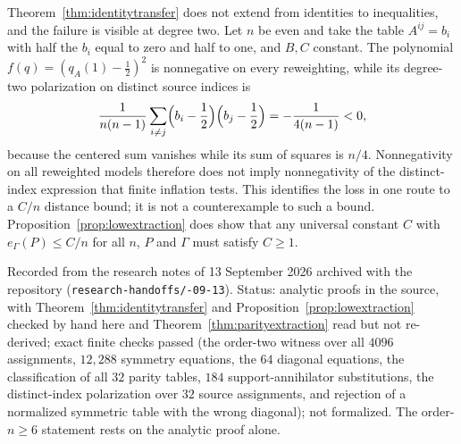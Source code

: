 Theorem~\ref{thm:identitytransfer} does not extend from identities to inequalities, and the failure is visible at degree two. Let $n$ be even and take the table $A^{ij}=b_i$ with half the $b_i$ equal to zero and half to one, and $B,C$ constant. The polynomial $f(q)=(q_A(1)-\tfrac12)^2$ is nonnegative on every reweighting, while its degree-two polarization on distinct source indices is
\[
\frac1{n(n-1)}\sum_{i\ne j}\Bigl(b_i-\frac12\Bigr)\Bigl(b_j-\frac12\Bigr)=-\frac1{4(n-1)}<0,
\]
because the centered sum vanishes while its sum of squares is $n/4$. Nonnegativity on all reweighted models therefore does not imply nonnegativity of the distinct-index expression that finite inflation tests. This identifies the loss in one route to a $C/n$ distance bound; it is not a counterexample to such a bound. Proposition~\ref{prop:lowextraction} does show that any universal constant $C$ with $e_\Gamma(P)\le C/n$ for all $n$, $P$ and $\Gamma$ must satisfy $C\ge1$.

Recorded from the research notes of 13 September 2026 archived with the repository (\texttt{research-\allowbreak handoffs/-09-13}). Status: analytic proofs in the source, with Theorem~\ref{thm:identitytransfer} and Proposition~\ref{prop:lowextraction} checked by hand here and Theorem~\ref{thm:parityextraction} read but not re-derived; exact finite checks passed (the order-two witness over all $4096$ assignments, $12{,}288$ symmetry equations, the $64$ diagonal equations, the classification of all $32$ parity tables, $184$ support-annihilator substitutions, the distinct-index polarization over $32$ source assignments, and rejection of a normalized symmetric table with the wrong diagonal); not formalized. The order-$n\ge6$ statement rests on the analytic proof alone.
